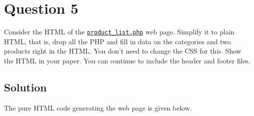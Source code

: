 
\section*{Question 5}

Consider the HTML of the \href{http://topcat.cs.umb.edu/book_apps/ch05_guitar_shop/product_manager/product_list.php}{\texttt{product\_list.php}} web page. Simplify it to plain HTML, that is, drop all the PHP and fill in data on the categories and two products right in the HTML. You don't need to change the CSS for this. Show the HTML in your paper. You can continue to include the header and footer files.

\subsection*{Solution}

The pure HTML code generating the web page is given below.

